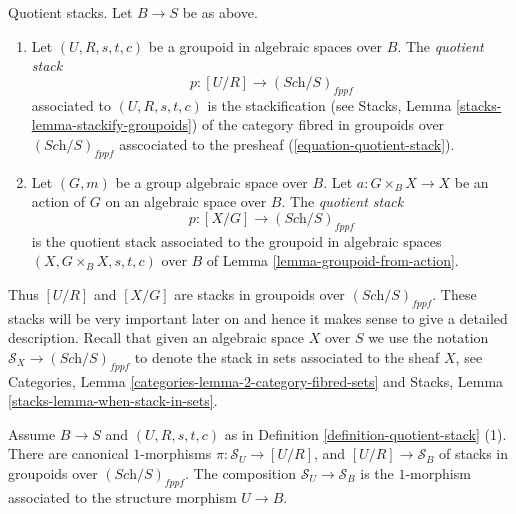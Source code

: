 \begin{definition}
\label{definition-quotient-stack}
Quotient stacks. Let $B \to S$ be as above.
\begin{enumerate}
\item Let $(U, R, s, t, c)$ be a groupoid in algebraic spaces over $B$.
The {\it quotient stack}
$$
p : [U/R] \longrightarrow (\textit{Sch}/S)_{fppf}
$$
associated to $(U, R, s, t, c)$ is the stackification (see
Stacks, Lemma \ref{stacks-lemma-stackify-groupoids})
of the category fibred in groupoids over
$(\textit{Sch}/S)_{fppf}$ asscociated to the presheaf
(\ref{equation-quotient-stack}).
\item Let $(G, m)$ be a group algebraic space over $B$.
Let $a : G \times_B X \to X$ be an action of $G$ on an algebraic space
over $B$. The {\it quotient stack}
$$
p : [X/G] \longrightarrow (\textit{Sch}/S)_{fppf}
$$
is the quotient stack associated to the groupoid in algebraic spaces
$(X, G \times_B X, s, t, c)$ over $B$ of
Lemma \ref{lemma-groupoid-from-action}.
\end{enumerate}
\end{definition}

\noindent
Thus $[U/R]$ and $[X/G]$ are stacks in groupoids over
$(\textit{Sch}/S)_{fppf}$. These stacks will be very important later
on and hence it makes sense to give a detailed description.
Recall that given an algebraic space $X$ over $S$ we use the
notation $\mathcal{S}_X \to (\textit{Sch}/S)_{fppf}$ to denote
the stack in sets associated to the sheaf $X$, see
Categories, Lemma \ref{categories-lemma-2-category-fibred-sets}
and
Stacks, Lemma \ref{stacks-lemma-when-stack-in-sets}.

\begin{lemma}
\label{lemma-quotient-stack-arrows}
Assume $B \to S$ and $(U, R, s, t, c)$ as in
Definition \ref{definition-quotient-stack} (1).
There are canonical $1$-morphisms
$\pi : \mathcal{S}_U \to [U/R]$, and $[U/R] \to \mathcal{S}_B$
of stacks in groupoids over $(\textit{Sch}/S)_{fppf}$.
The composition $\mathcal{S}_U \to \mathcal{S}_B$ is the $1$-morphism
associated to the structure morphism $U \to B$.
\end{lemma}

